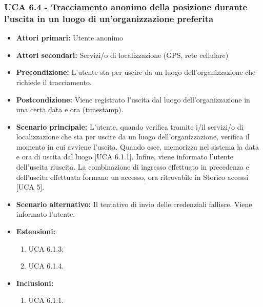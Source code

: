 \subsubsection{UCA 6.4 - Tracciamento anonimo della posizione durante l'uscita in un luogo di un'organizzazione preferita}
\begin{itemize}
	\item \textbf{Attori primari:} Utente anonimo
	\item \textbf{Attori secondari:} Servizi/o di localizzazione (GPS, rete cellulare)
	\item \textbf{Precondizione:} L'utente sta per uscire da un luogo dell'organizzazione che richiede il tracciamento.
	\item \textbf{Postcondizione:} Viene registrato l'uscita dal luogo dell'organizzazione in una certa data e ora (timestamp).
	\item \textbf{Scenario principale:} L'utente, quando verifica tramite i/il servizi/o di localizzazione che sta per uscire da un luogo dell'organizzazione, verifica il momento in cui avviene l'uscita. Quando esce, memorizza nel sistema la data e ora di uscita dal luogo [UCA 6.1.1]. Infine, viene informato l'utente dell'uscita riuscita. La combinazione di ingresso effettuato in precedenza e dell'uscita effettuata formano un accesso, ora ritrovabile in Storico accessi [UCA 5].
	\item \textbf{Scenario alternativo:} Il tentativo di invio delle credenziali fallisce. Viene informato l'utente.
	\item \textbf{Estensioni:}
	\begin{enumerate}
		\item UCA 6.1.3;
		\item UCA 6.1.4.
	\end{enumerate}
	\item \textbf{Inclusioni:}
	\begin{enumerate}
		\item UCA 6.1.1.
	\end{enumerate}
\end{itemize}